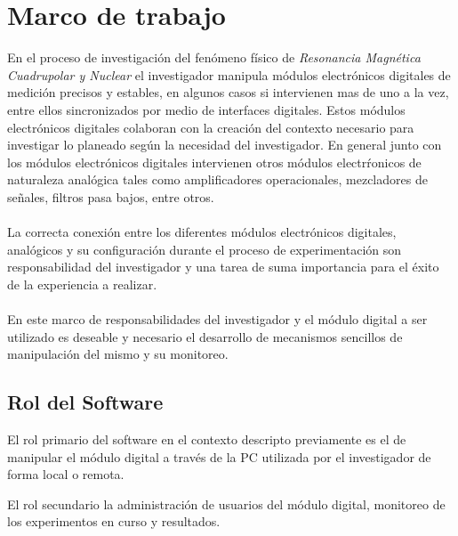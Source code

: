 \section{Marco de trabajo}

En el proceso de investigaci\'on del fen\'omeno f\'isico de \textit{Resonancia Magn\'etica Cuadrupolar y Nuclear} 
el investigador manipula m\'odulos electr\'onicos digitales de medici\'on precisos 
y estables, en algunos casos si intervienen mas de uno a la vez, entre ellos sincronizados 
por medio de interfaces digitales. 
Estos m\'odulos electr\'onicos digitales colaboran con la creaci\'on del contexto necesario 
para investigar lo planeado seg\'un la necesidad del investigador.
En general junto con los m\'odulos electr\'onicos digitales intervienen otros m\'odulos electr\'ronicos de 
naturaleza anal\'ogica tales como amplificadores operacionales, mezcladores de señales, 
filtros pasa bajos, entre otros.
\\\\
La correcta conexi\'on entre los diferentes m\'odulos electr\'onicos digitales, 
anal\'ogicos y su configuraci\'on durante el proceso de experimentaci\'on son 
responsabilidad del investigador y una tarea de suma importancia para el \'exito de la experiencia a realizar.
\\\\
En este marco de responsabilidades del investigador y el m\'odulo digital a ser utilizado es deseable 
y necesario el desarrollo de mecanismos sencillos de manipulaci\'on del mismo y su monitoreo.

\subsection{Rol del Software}

El rol primario del software en el contexto descripto previamente es el de manipular 
el m\'odulo digital a trav\'es de la PC utilizada por el investigador de forma local o remota.

El rol secundario la administraci\'on de usuarios del m\'odulo digital, monitoreo de los experimentos en curso y resultados.

\newpage

